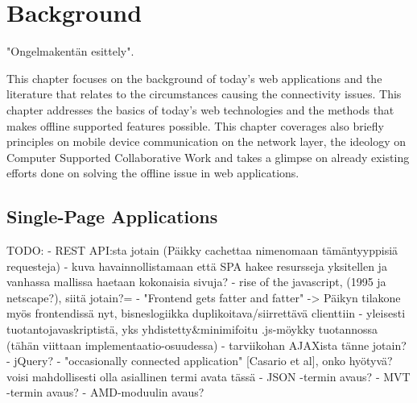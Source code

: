 
\chapter{Background}

"Ongelmakentän esittely".

This chapter focuses on the background of today's web applications and the literature that relates to the circumstances causing the connectivity issues. This chapter addresses the basics of today's web technologies and the methods that makes offline supported features possible. This chapter coverages also briefly principles on mobile device communication on the network layer, the ideology on Computer Supported Collaborative Work and takes a glimpse on already existing efforts done on solving the offline issue in web applications.



\section{Single-Page Applications}
TODO: %
- REST API:sta jotain (Päikky cachettaa nimenomaan tämäntyyppisiä requesteja)
- kuva havainnollistamaan että SPA hakee resursseja yksitellen ja vanhassa mallissa haetaan kokonaisia sivuja?
- rise of the javascript, (1995 ja netscape?), siitä jotain?=
- "Frontend gets fatter and fatter" -> Päikyn tilakone myös frontendissä nyt, bisneslogiikka duplikoitava/siirrettävä clienttiin
- yleisesti tuotantojavaskriptistä, yks yhdistetty&minimifoitu .js-möykky tuotannossa (tähän viittaan implementaatio-osuudessa)
- tarviikohan AJAXista tänne jotain?
- jQuery?
- "occasionally connected application" [Casario et al], onko hyötyvä? voisi mahdollisesti olla asiallinen termi avata tässä
- JSON -termin avaus?
- MVT -termin avaus?
- AMD-moduulin avaus?


